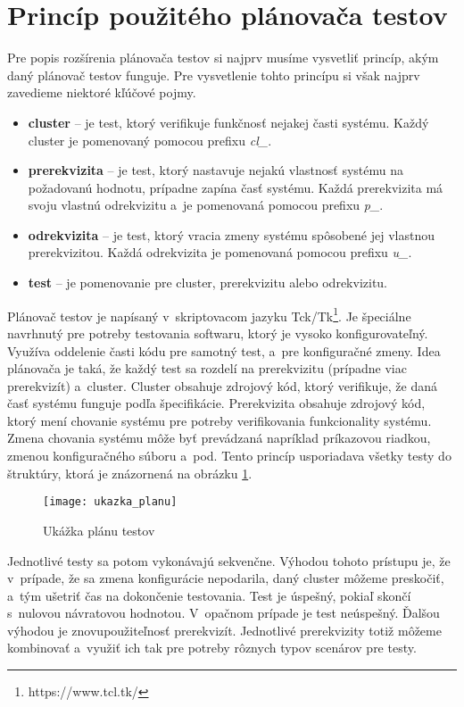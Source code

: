 \section{Princíp použitého plánovača testov} 
\label{sekcia:princip_pouziteho_planovaca}
Pre popis rozšírenia plánovača testov si najprv musíme vysvetliť princíp, akým daný plánovač testov funguje.
Pre vysvetlenie tohto princípu si však najprv zavedieme niektoré kľúčové pojmy.
\begin{itemize}
\item \textbf{cluster} -- je test, ktorý verifikuje funkčnosť nejakej časti systému. Každý cluster je pomenovaný pomocou prefixu {\it cl\_}. 
\item \textbf{prerekvizita} -- je test, ktorý nastavuje nejakú vlastnosť systému na požadovanú hodnotu, prípadne zapína časť systému. 
Každá prerekvizita má svoju vlastnú odrekvizitu a~je pomenovaná pomocou prefixu {\it p\_}.
\item \textbf{odrekvizita} -- je test, ktorý vracia zmeny systému spôsobené jej vlastnou prerekvizitou. Každá odrekvizita je pomenovaná
pomocou prefixu {\it u\_}. 
\item \textbf{test} -- je pomenovanie pre cluster, prerekvizitu alebo odrekvizitu.
\end{itemize}

Plánovač testov je napísaný v~skriptovacom jazyku Tck/Tk\footnote{https://www.tcl.tk/}. 
Je špeciálne navrhnutý pre potreby testovania softwaru, ktorý je vysoko konfigurovateľný. 
Využíva oddelenie časti kódu pre samotný test, a~pre konfiguračné zmeny. 
Idea plánovača je taká, že každý test sa rozdelí na prerekvizitu (prípadne viac prerekvizít) a~cluster. Cluster obsahuje zdrojový kód, ktorý verifikuje, že daná
časť systému funguje podľa špecifikácie. Prerekvizita obsahuje zdrojový kód, ktorý mení chovanie systému pre potreby verifikovania funkcionality systému.
Zmena chovania systému môže byť prevádzaná napríklad príkazovou riadkou, zmenou konfiguračného súboru a~pod.
Tento princíp usporiadava všetky testy do štruktúry, ktorá je znázornená na obrázku \ref{obrazok:ukazka_planu_testov}.
\begin{figure}[h]
    \begin{center}
    \texttt{[image: ukazka\_planu]}
    \caption{Ukážka plánu testov}
    \label{obrazok:ukazka_planu_testov}
    \end{center}
\end{figure}

Jednotlivé testy sa potom vykonávajú sekvenčne. Výhodou tohoto prístupu je, že v~prípade, že sa zmena konfigurácie nepodarila,
daný cluster môžeme preskočiť, a~tým ušetriť čas na dokončenie testovania. 
Test je úspešný, pokiaľ skončí s~nulovou návratovou hodnotou. V~opačnom prípade je test neúspešný. 
Ďalšou výhodou je znovupoužiteľnosť prerekvizít. 
Jednotlivé prerekvizity totiž môžeme kombinovať a~využiť ich tak pre potreby rôznych typov scenárov pre testy. 

